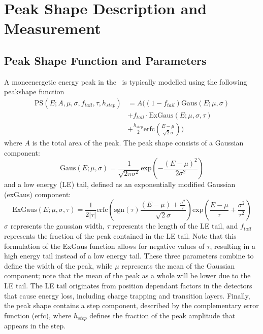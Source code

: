 \documentclass[/main.tex]{subfiles}
\begin{document}
\onlyinsubfile{\appendix}
\chapter{Peak Shape Description and Measurement} \label{app:peakshape}

\section{Peak Shape Function and Parameters}
A moneenergetic energy peak in the \MJD\ is typically modelled using the following peakshape function
\begin{equation}
  \begin{aligned}
    \mathrm{PS}(E; A, \mu, \sigma, f_{tail}, \tau, h_{step}) &= A\big((1-f_{tail})\mathrm{Gaus}(E; \mu, \sigma) \\&+ f_{tail}\cdot\mathrm{ExGaus}(E; \mu, \sigma, \tau) \\&+ \frac{h_{step}}{2}\mathrm{erfc}(\frac{E-\mu}{\sqrt{2}\sigma})\big)
  \end{aligned}
\end{equation}
where $A$ is the total area of the peak.
The peak shape consists of a Gaussian component:
\begin{equation}
  \mathrm{Gaus}(E; \mu, \sigma) = \frac{1}{\sqrt{2\pi\sigma^2}}\mathrm{exp}(-\frac{(E-\mu)^2}{2\sigma^2})
\end{equation}
and a low energy (LE) tail, defined as an exponentially modified Gaussian (exGaus) component:
\begin{equation}
  \mathrm{ExGaus}(E; \mu, \sigma, \tau) = \frac{1}{2|\tau|} \mathrm{erfc}(\mathrm{sgn}(\tau)\frac{(E-\mu) + \frac{\sigma^2}{\tau}}{\sqrt{2}\sigma})\mathrm{exp}(\frac{E-\mu}{\tau}+\frac{\sigma^2}{\tau^2})
\end{equation}
$\sigma$ represents the gaussian width, $\tau$ represents the length of the LE tail, and $f_{tail}$ represents the fraction of the peak contained in the LE tail.
Note that this formulation of the ExGaus function allows for negative values of $\tau$, resulting in a high energy tail instead of a low energy tail.
These three parameters combine to define the width of the peak, while $\mu$ represents the mean of the Gaussian component; note that the mean of the peak as a whole will be lower due to the LE tail.
The LE tail originates from position dependant factors in the detectors that cause energy loss, including charge trapping and transition layers.
Finally, the peak shape contains a step component, described by the complementary error function (erfc), where $h_{step}$ defines the fraction of the peak amplitude that appears in the step.
\end{document}
